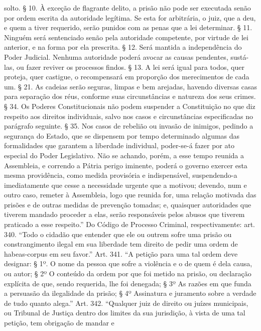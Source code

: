 {{  solto. § 10. À exceção de flagrante delito, a prisão não pode ser
  executada senão por ordem escrita da autoridade legítima. Se esta for
  arbitrária, o juiz, que a deu, e quem a tiver requerido, serão punidos
  com as penas que a lei determinar. § 11. Ninguém será sentenciado
  senão pela autoridade competente, por virtude de lei anterior, e na
  forma por ela prescrita. § 12. Será mantida a independência do Poder
  Judicial. Nenhuma autoridade poderá avocar as causas pendentes,
  sustá-las, ou fazer reviver os processos findos. § 13. A lei será
  igual para todos, quer proteja, quer castigue, o recompensará em
  proporção dos merecimentos de cada um. § 21. As cadeias serão seguras,
  limpas e bem arejadas, havendo diversas casas para separação dos réus,
  conforme suas circunstâncias e natureza dos seus crimes. § 34. Os
  Poderes Constitucionais não podem suspender a Constituição no que diz
  respeito aos direitos individuais, salvo nos casos e circunstâncias
  especificadas no parágrafo seguinte. § 35. Nos casos de rebelião ou
  invasão de inimigos, pedindo a segurança do Estado, que se dispensem
  por tempo determinado algumas das formalidades que garantem a
  liberdade individual, poder-se-á fazer por ato especial do Poder
  Legislativo. Não se achando, porém, a esse tempo reunida a Assembleia,
  e correndo a Pátria perigo iminente, poderá o governo exercer esta
  mesma providência, como medida provisória e indispensável,
  suspendendo-a imediatamente que cesse a necessidade urgente que a
  motivou; devendo, num e outro caso, remeter à Assembleia, logo que
  reunida for, uma relação motivada das prisões e de outras medidas de
  prevenção tomadas; e, quaisquer autoridades que tiverem mandado
  proceder a elas, serão responsáveis pelos abusos que tiverem praticado
  a esse respeito.'' Do Código de Processo Criminal, respectivamente:
  art. 340. ``Todo o cidadão que entender que ele ou outrem sofre uma
  prisão ou constrangimento ilegal em sua liberdade tem direito de
  pedir uma ordem de habeas-corpus em seu favor.'' Art. 341. ``A petição
  para uma tal ordem deve designar: § 1º. O nome da pessoa que sofre a
  violência e o de quem é dela causa, ou autor; § 2º O conteúdo da ordem
  por que foi metido na prisão, ou declaração explícita de que, sendo
  requerida, lhe foi denegada; § 3º As razões em que funda a persuasão
  da ilegalidade da prisão; § 4º Assinatura e juramento sobre a verdade
  de tudo quanto alega.'' Art. 342. ``Qualquer juiz de direito ou juízes
  municipais, ou Tribunal de Justiça dentro dos limites da sua
  jurisdição, à vista de uma tal petição, tem obrigação de mandar e
}}
